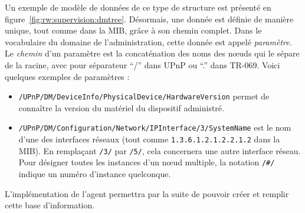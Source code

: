 Un exemple de modèle de données de ce type de structure est présenté en figure~\ref{fig:rw:supervision:dmtree}. Désormais, une donnée est définie de manière unique, tout comme dans la MIB, grâce à son chemin complet. Dans le vocabulaire du domaine de l'administration, cette donnée est appelé \textit{paramètre}. Le \textit{chemin} d'un paramètre est la concaténation des noms des nœuds qui le sépare de la racine, avec pour séparateur \enquote{/} dans UPnP ou \enquote{.} dans TR-069. Voici quelques exemples de paramètres :
\begin{itemize}
\item \verb|/UPnP/DM/DeviceInfo/PhysicalDevice/HardwareVersion| permet de connaître la version du matériel du dispositif administré. 
\item \verb|/UPnP/DM/Configuration/Network/IPInterface/3/SystemName| est le nom d'une des interfaces réseaux (tout comme \verb|1.3.6.1.2.1.2.2.1.2| dans la MIB). En remplaçant \verb|/3/| par \verb|/5/|, cela concernera une autre interface réseau. Pour désigner toutes les instances d'un nœud multiple, la notation \verb|/#/| indique un numéro d'instance quelconque.
\end{itemize}

L'implémentation de l'agent permettra par la suite de pouvoir créer et remplir cette base d'information.

